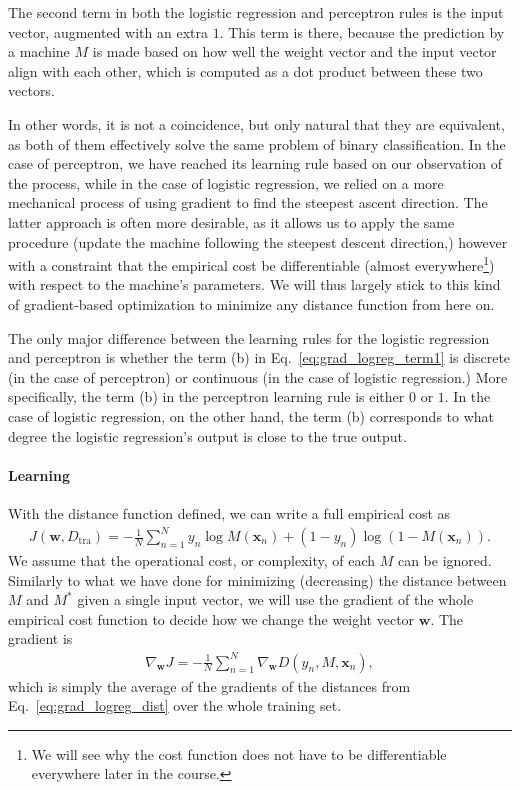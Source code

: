 \documentclass{report}
\newcommand{\vect}[1]{\mathbf{#1}}
\newcommand{\vx}[0]{\vect{x}}
\newcommand{\vw}[0]{\vect{w}}
\begin{document}
The second term in both the logistic regression and perceptron rules is the
input vector, augmented with an extra $1$. This term is there, because the
prediction by a machine $M$ is made based on how well the weight vector and the
input vector align with each other, which is computed as a dot product between
these two vectors. 

In other words, it is not a coincidence, but only natural that they are
equivalent, as both of them effectively solve the same problem of binary
classification. In the case of perceptron, we have reached its learning rule
based on our observation of the process, while in the case of logistic
regression, we relied on a more mechanical process of using gradient to find the
steepest ascent direction. The latter approach is often more desirable, as it
allows us to apply the same procedure (update the machine following the steepest
descent direction,) however with a constraint that the empirical cost be
differentiable (almost everywhere\footnote{
    We will see why the cost function does not have to be differentiable
    everywhere later in the course.
}) with respect to the machine's parameters. We will thus largely stick to this
kind of gradient-based optimization to minimize any distance function from here
on.

The only major difference between the learning rules for the logistic regression
and perceptron is whether the term (b) in Eq.~\eqref{eq:grad_logreg_term1} is
discrete (in the case of perceptron) or continuous (in the case of logistic
regression.) More specifically, the term (b) in the perceptron learning rule is
either $0$ or $1$. In the case of logistic regression, on the other hand, the
term (b) corresponds to what degree the logistic regression's output is close to
the true output.

\paragraph{Learning}

With the distance function defined, we can write a full empirical cost as
\begin{align*}
    J(\vw, D_{\text{tra}}) = -\frac{1}{N} \sum_{n=1}^N 
    y_n \log M(\vx_n) + (1-y_n) \log (1- M(\vx_n)).
\end{align*}
We assume that the operational cost, or complexity, of each $M$ can be ignored. 
Similarly to what we have done for minimizing (decreasing) the distance between
$M$ and $M^*$ given a single input vector, we will use the gradient of the whole
empirical cost function to decide how we change the weight vector $\vw$. The
gradient is 
\begin{align*}
    \nabla_{\vw} J = -\frac{1}{N} \sum_{n=1}^N \nabla_{\vw} D(y_n, M, \vx_n),
\end{align*}
which is simply the average of the gradients of the distances from
Eq.~\eqref{eq:grad_logreg_dist} over the whole training set.
\end{document}
